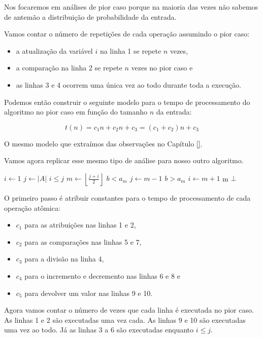 Nos focaremos em análises de pior caso porque na maioria das vezes não sabemos de antemão a distribuição de probabilidade da entrada.

Vamos contar o número de repetições de cada operação assumindo o pior caso:
\begin{itemize}
\item a atualização da variável $i$ na linha 1 se repete $n$ vezes,
\item a comparação na linha 2 se repete $n$ vezes no pior caso e
\item as linhas 3 e 4 ocorrem uma única vez ao todo durante toda a execução.
\end{itemize}

Podemos então construir o seguinte modelo para o tempo de processamento do algoritmo no pior caso em função do tamanho $n$ da entrada:

\begin{displaymath}
  t(n) = c_1n + c_2n + c_3 = (c_1 + c_2)n + c_3
\end{displaymath}

O mesmo modelo que extraímos das observações no Capítulo \ref{}.

Vamos agora replicar esse mesmo tipo de análise para nosso outro algoritmo.
\begin{codebox}
  \li $i \gets 1$
  \li $j \gets |A|$
  \li \While $i \leq j$
  \li \Do $m \gets \left \lfloor{\frac{j+i}{2}}\right\rfloor$
  \li \If $b < a_m$
  \li     \Then $j \gets m - 1$
  \li \Else
      \If $b > a_m$
  \li      \Then $i \gets m + 1$
  \li \Else \Return m 
      \End
  \End
  \End
  \li \Return $\bot$
\end{codebox}

O primeiro passo é atribuir constantes para o tempo de processamento de cada operação atômica:
\begin{itemize}
\item $c_1$ para as atribuições nas linhas 1 e 2,
\item $c_2$ para as comparações nas linhas 5 e 7,
\item $c_3$ para a divisão na linha 4,
\item $c_4$ para o incremento e decremento nas linhas 6 e 8 e
\item $c_5$ para devolver um valor nas linhas 9 e 10.
\end{itemize}

Agora vamos contar o número de vezes que cada linha é executada no pior caso.
As linhas 1 e 2 são executadas uma vez cada.
As linhas 9 e 10 são executadas uma vez ao todo.
Já as linhas 3 a 6 são executadas enquanto $i \leq j$.

